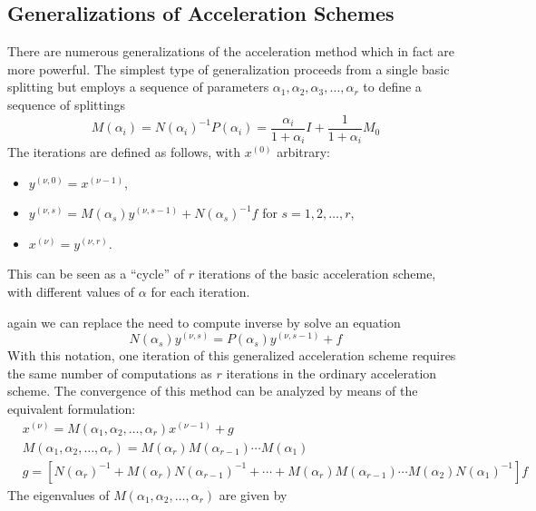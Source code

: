 \documentclass[../main.tex]{subfiles}
\begin{document}
\subsection{Generalizations of Acceleration Schemes}
There are numerous generalizations of the acceleration method which in fact are more powerful. The simplest type of generalization proceeds from a single basic splitting but employs a sequence of parameters $\alpha_1, \alpha_2, \alpha_3, \ldots, \alpha_r$ to define a sequence of splittings
\begin{equation*}
	M(\alpha_i) = N(\alpha_i)^{-1} P(\alpha_i) = \frac{\alpha_i}{1 + \alpha_i} I + \frac{1}{1 + \alpha_i} M_0
\end{equation*}
The iterations are defined as follows, with $x^{(0)}$ arbitrary:
\begin{itemize}
	\item $y^{(\nu, 0)} = x^{(\nu-1)}$,
	\item $y^{(\nu, s)} = M(\alpha_s) y^{(\nu, s-1)} + N(\alpha_s)^{-1} f$ for $s = 1, 2, \ldots, r$,
	\item $x^{(\nu)} = y^{(\nu, r)}$.
\end{itemize}
\begin{remark}
	This can be seen as a ``cycle'' of $r$ iterations of the basic acceleration scheme, with different values of $\alpha$ for each iteration.
\end{remark}
again we can replace the need to compute inverse by solve an equation
\begin{equation*}
	N(\alpha_s) y^{(\nu, s)} = P(\alpha_s) y^{(\nu, s-1)} + f
\end{equation*}
With this notation, one iteration of this generalized acceleration scheme requires the same number of computations as $r$ iterations in the ordinary acceleration scheme. The convergence of this method can be analyzed by means of the equivalent formulation:
\begin{equation*}
	\begin{aligned}
		&x^{(\nu)} = M(\alpha_1, \alpha_2, \ldots, \alpha_r) x^{(\nu-1)} + g\\
		&M(\alpha_1, \alpha_2, \ldots, \alpha_r) = M(\alpha_r) M(\alpha_{r-1}) \cdots M(\alpha_1) \\
		&g = [N(\alpha_r)^{-1} + M(\alpha_r) N(\alpha_{r-1})^{-1} + \cdots + M(\alpha_r) M(\alpha_{r-1}) \cdots M(\alpha_2) N(\alpha_1)^{-1}] f
	\end{aligned}
\end{equation*}
The eigenvalues of $M(\alpha_1, \alpha_2, \ldots, \alpha_r)$ are given by
\end{document}
